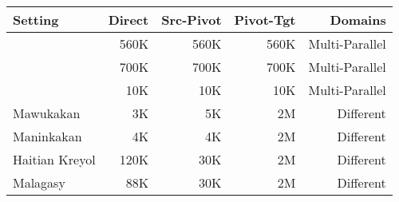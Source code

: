 \begin{tabular}{lrrrr}
\toprule
Setting & Direct & Src-Pivot & Pivot-Tgt & Domains\\
\toprule
~\cite{Utiyama:07} & 560K & 560K & 560K & Multi-Parallel\\
~\cite{Cohn:07} & 700K & 700K & 700K & Multi-Parallel\\
~\cite{Cohn:07} & 10K & 10K & 10K & Multi-Parallel\\
\midrule
Mawukakan & 3K & 5K & 2M & Different\\
Maninkakan & 4K & 4K & 2M  & Different \\ 
Haitian Kreyol & 120K & 30K & 2M & Different\\
Malagasy & 88K & 30K & 2M & Different\\
\bottomrule
\end{tabular}
 

